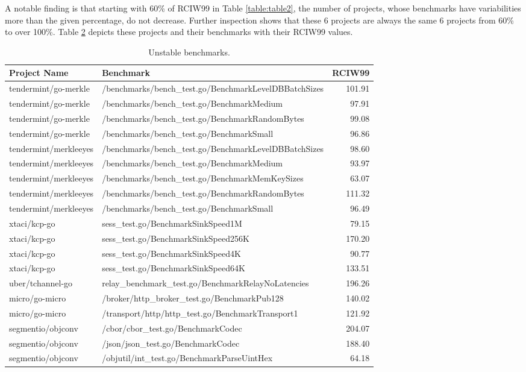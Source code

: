 \documentclass{seal_thesis}
\begin{document}
\noindent A notable finding is that starting with 60\% of RCIW99 in Table \ref{table:table2}, the number of projects, whose benchmarks have variabilities more than the given percentage, do not decrease. Further inspection shows that these 6 projects are always the same 6 projects from 60\% to over 100\%. Table \ref{table:unstable} depicts these projects and their benchmarks with their RCIW99 values.

\begin{table}[H]
\begin{longtable}[c]{@{}llr@{}}
	\caption{Unstable benchmarks.}
	\label{table:unstable}\\
	\toprule
	Project Name & Benchmark & RCIW99 \\* \midrule
	\endfirsthead
	\endhead
	\bottomrule
	\endfoot
	\endlastfoot
	tendermint/go-merkle & /benchmarks/bench\_test.go/BenchmarkLevelDBBatchSizes & 101.91 \\
	tendermint/go-merkle & /benchmarks/bench\_test.go/BenchmarkMedium & 97.91 \\
	tendermint/go-merkle & /benchmarks/bench\_test.go/BenchmarkRandomBytes & 99.08 \\
	tendermint/go-merkle & /benchmarks/bench\_test.go/BenchmarkSmall & 96.86 \\
	tendermint/merkleeyes & /benchmarks/bench\_test.go/BenchmarkLevelDBBatchSizes & 98.60 \\
	tendermint/merkleeyes & /benchmarks/bench\_test.go/BenchmarkMedium & 93.97 \\
	tendermint/merkleeyes & /benchmarks/bench\_test.go/BenchmarkMemKeySizes & 63.07 \\
	tendermint/merkleeyes & /benchmarks/bench\_test.go/BenchmarkRandomBytes & 111.32 \\
	tendermint/merkleeyes & /benchmarks/bench\_test.go/BenchmarkSmall & 96.49 \\
	xtaci/kcp-go & sess\_test.go/BenchmarkSinkSpeed1M & 79.15 \\
	xtaci/kcp-go & sess\_test.go/BenchmarkSinkSpeed256K & 170.20 \\
	xtaci/kcp-go & sess\_test.go/BenchmarkSinkSpeed4K & 90.77 \\
	xtaci/kcp-go & sess\_test.go/BenchmarkSinkSpeed64K & 133.51 \\
	uber/tchannel-go & relay\_benchmark\_test.go/BenchmarkRelayNoLatencies & 196.26 \\
	micro/go-micro & /broker/http\_broker\_test.go/BenchmarkPub128 & 140.02 \\
	micro/go-micro & /transport/http/http\_test.go/BenchmarkTransport1 & 121.92 \\
	segmentio/objconv & /cbor/cbor\_test.go/BenchmarkCodec & 204.07 \\
	segmentio/objconv & /json/json\_test.go/BenchmarkCodec & 188.40 \\
	segmentio/objconv & /objutil/int\_test.go/BenchmarkParseUintHex & 64.18 \\* \bottomrule
\end{longtable}
\end{table}
\end{document}
